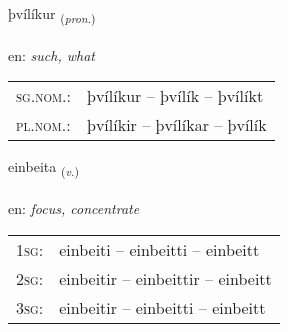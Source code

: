 \documentclass[frontgrid, backgrid]{flacards}\usepackage[]{graphicx}\usepackage[]{xcolor}
\begin{document}
\renewcommand{\blhead}{\vskip5pt {\small\bfseries\footnotesize Fornafn | Pronoun }}
\renewcommand{\bcfoot}{\vskip5pt \hspace{2pt}{\small\bfseries\footnotesize 3K}}


{þvílíkur \small{\textsubscript{(\textit{pron.})}} \\[1ex] %
\textphonetic{[θviːlikʏr]} \\
en: \emph{such, what} \\  [2ex]
\renewcommand*{\arraystretch}{0.8}
\begin{tabular}{ll}
\textsc{sg.nom.}: & þvílíkur  --  þvílík -- þvílíkt \\ 
\textsc{pl.nom.}: & þvílíkir -- þvílíkar -- þvílík
\end{tabular}
}

\renewcommand{\flhead}{\vskip5pt \fboxsep=0pt {\small\bfseries\footnotesize Sagnorð | Verb}}
\renewcommand{\fcfoot}{\vskip5pt \fboxsep=0pt \hspace{2pt}{\small\bfseries\footnotesize 3K}}

\renewcommand{\blhead}{\vskip5pt {\small\bfseries\footnotesize Sagnorð | Verb }}
\renewcommand{\bcfoot}{\vskip5pt \hspace{2pt}{\small\bfseries\footnotesize 3K}}


{einbeita \small{\textsubscript{(\textit{v.})}} \\[1ex] %
\textphonetic{[einpeita]} \\
en: \emph{focus, concentrate} \\  [2ex]
\renewcommand*{\arraystretch}{0.8}
\begin{tabular}{p{1cm}l}
\textsc{1sg}: & einbeiti -- einbeitti -- einbeitt \\ 
\textsc{2sg}: & einbeitir -- einbeittir -- einbeitt \\ 
\textsc{3sg}: & einbeitir -- einbeitti -- einbeitt \\ 
\end{tabular}
}

\renewcommand{\flhead}{\vskip5pt \fboxsep=0pt {\small\bfseries\footnotesize Nafnorð | Noun}}
\renewcommand{\fcfoot}{\vskip5pt \fboxsep=0pt \hspace{2pt}{\small\bfseries\footnotesize 3K}}
\end{document}
